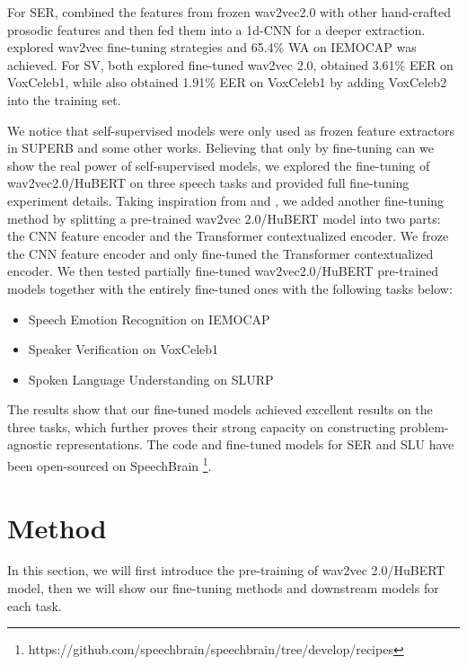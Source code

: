 \documentclass{article}
\begin{document}
For SER, \cite{Interspeech-emotion} combined the features from frozen wav2vec2.0 with other hand-crafted prosodic features and then fed them into a 1d-CNN for a deeper extraction. \cite{Interspeech-emotion-2} explored wav2vec fine-tuning strategies and 65.4\% WA on IEMOCAP was achieved. For SV, \cite{Interspeech-speaker, speaker-sota} both explored fine-tuned wav2vec 2.0, \cite{Interspeech-speaker} obtained 3.61\% EER on VoxCeleb1, while \cite{speaker-sota} also obtained 1.91\% EER on VoxCeleb1 by adding VoxCeleb2 into the training set.




We notice that self-supervised models were only used as frozen feature extractors in SUPERB and some other works. Believing that only by fine-tuning can we show the real power of self-supervised models, we explored the fine-tuning of wav2vec2.0/HuBERT on three speech tasks and provided full fine-tuning experiment details. Taking inspiration from \cite{wav2vec2} and \cite{HuBERT}, we added another fine-tuning method by splitting a pre-trained wav2vec 2.0/HuBERT model into two parts: the CNN feature encoder and the Transformer contextualized encoder. We froze the CNN feature encoder and only fine-tuned the Transformer contextualized encoder. We then tested partially fine-tuned wav2vec2.0/HuBERT pre-trained models together with the entirely fine-tuned ones with the following tasks below: 
\begin{itemize}
    \item  Speech Emotion Recognition on IEMOCAP
    \item  Speaker Verification on VoxCeleb1
    \item  Spoken Language Understanding on SLURP \cite{SLURP}
\end{itemize}


The results show that our fine-tuned models achieved excellent results on the three tasks, which further proves their strong capacity on constructing problem-agnostic representations. The code and fine-tuned models for SER and SLU have been open-sourced on SpeechBrain \cite{SpeechBrain} \footnote{https://github.com/speechbrain/speechbrain/tree/develop/recipes}.



\section{Method}

In this section, we will first introduce the pre-training of wav2vec 2.0/HuBERT model, then we will show our fine-tuning methods and downstream models for each task.
\end{document}
